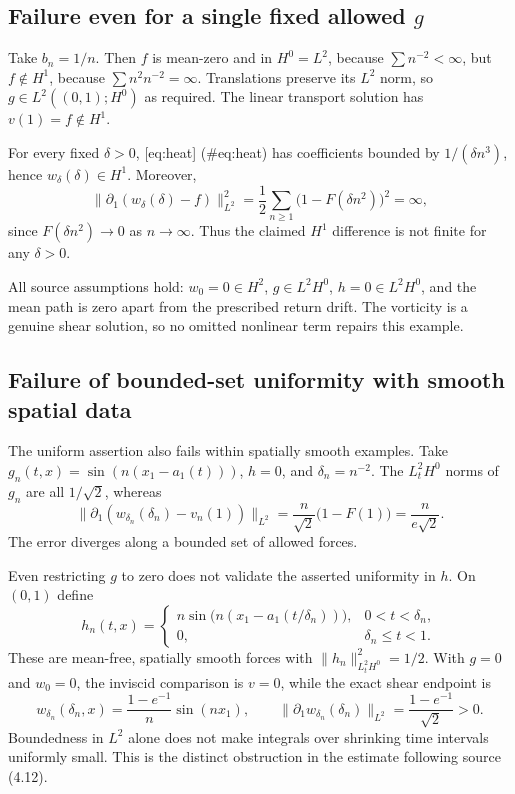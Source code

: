 \documentclass[10pt]{article}
\begin{document}
\subsection*{Failure even for a single fixed allowed \(g\)}
Take \(b_n=1/n\). Then \(f\) is mean-zero and in \(H^0=L^2\), because \(\sum n^{-2}<\infty\), but \(f\notin H^1\), because \(\sum n^2n^{-2}=\infty\). Translations preserve its \(L^2\) norm, so \(g\in L^2((0,1);H^0)\) as required. The linear transport solution has \(v(1)=f\notin H^1\).\par
For every fixed \(\delta>0\), [eq:heat] (\#eq:heat) has coefficients bounded by \(1/(\delta n^3)\), hence \(w_\delta(\delta)\in H^1\). Moreover, \[\|\partial_1(w_\delta(\delta)-f)\|_{L^2}^2
 =\frac12\sum_{n\ge1}\bigl(1-F(\delta n^2)\bigr)^2=\infty ,\] since \(F(\delta n^2)\to0\) as \(n\to\infty\). Thus the claimed \(H^1\) difference is not finite for any \(\delta>0\).\par
All source assumptions hold: \(w_0=0\in H^2\), \(g\in L^2H^0\), \(h=0\in L^2H^0\), and the mean path is zero apart from the prescribed return drift. The vorticity is a genuine shear solution, so no omitted nonlinear term repairs this example.\par
\subsection*{Failure of bounded-set uniformity with smooth spatial data}
The uniform assertion also fails within spatially smooth examples. Take \(g_n(t,x)=\sin(n(x_1-a_1(t)))\), \(h=0\), and \(\delta_n=n^{-2}\). The \(L^2_tH^0\) norms of \(g_n\) are all \(1/\sqrt2\), whereas \[\|\partial_1(w_{\delta_n}(\delta_n)-v_n(1))\|_{L^2}
 =\frac{n}{\sqrt2}\bigl(1-F(1)\bigr)
 =\frac{n}{e\sqrt2}.\] The error diverges along a bounded set of allowed forces.\par
Even restricting \(g\) to zero does not validate the asserted uniformity in \(h\). On \((0,1)\) define \[h_n(t,x)=
 \begin{cases}
 n\sin\!\bigl(n(x_1-a_1(t/\delta_n))\bigr),&0<t<\delta_n,\\
 0,&\delta_n\le t<1 .
 \end{cases}\] These are mean-free, spatially smooth forces with \(\|h_n\|_{L^2_tH^0}^2=1/2\). With \(g=0\) and \(w_0=0\), the inviscid comparison is \(v=0\), while the exact shear endpoint is \[w_{\delta_n}(\delta_n,x)=\frac{1-e^{-1}}{n}\sin(nx_1),
 \qquad
 \|\partial_1w_{\delta_n}(\delta_n)\|_{L^2}
 =\frac{1-e^{-1}}{\sqrt2}>0.\] Boundedness in \(L^2\) alone does not make integrals over shrinking time intervals uniformly small. This is the distinct obstruction in the estimate following source (4.12).\par
\end{document}
